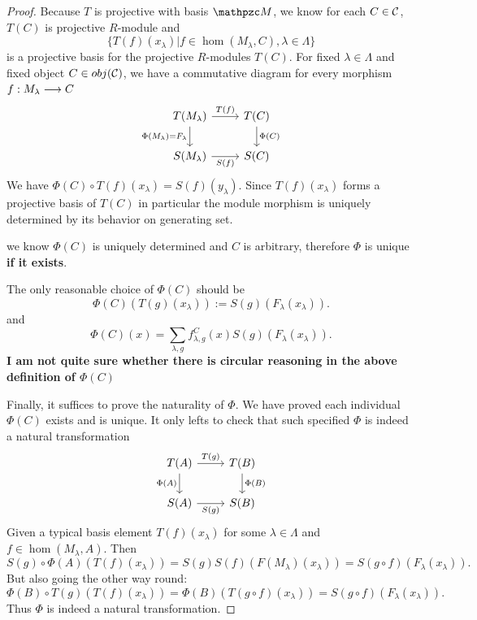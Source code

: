 \documentclass[11pt]{book} %
\begin{document}
\begin{proof}
Because $T$ is projective with basis $\pzm$, we know for each $C\in{\cal C}$, $T(C)$ is projective $R$-module and
$$
\{T(f)(x_\lambda)|f\in \hom(M_\lambda,C), \lambda\in \Lambda\}
$$
is a projective basis for the projective $R$-modules $T(C)$. For fixed $\lambda\in \Lambda$ and fixed object $C\in obj({\cal C})$, we have a commutative diagram for every morphism $f: M_\lambda\longrightarrow C$
\[
\begin{tikzcd}
T(M_\lambda) \arrow[r, "T(f)"] \arrow[d, "\Phi(M_\lambda)=F_\lambda"'] & T(C) \arrow[d, "\Phi(C)"] \\
S(M_\lambda) \arrow[r, "S(f)"'] & S(C)
\end{tikzcd}
\]
We have $\Phi(C)\circ T(f)(x_\lambda)=S(f)(y_\lambda)$. Since $T(f)(x_\lambda)$ forms a projective basis of $T(C)$ in particular the module morphism is uniquely determined by its behavior on generating set.

 we know $\Phi(C)$ is uniquely determined and $C$ is arbitrary, therefore $\Phi$ is unique \textbf{if it exists}.

The only reasonable choice of $\Phi(C)$ should be
$$
\Phi(C)(T(g)(x_\lambda)):=S(g)(F_\lambda(x_\lambda)).
$$
and
$$
\Phi(C)(x)=\sum_{\lambda,g} f_{\lambda,g}^C(x) S(g)(F_\lambda(x_\lambda)).
$$
\textbf{I am not quite sure whether there is circular reasoning in the above definition of $\Phi(C)$}

Finally, it suffices to prove the naturality of $\Phi$. We have proved each individual $\Phi(C)$ exists and is unique. It only lefts to check that such specified $\Phi$ is indeed a natural transformation
\[
\begin{tikzcd}
T(A) \arrow[r, "T(g)"] \arrow[d, "\Phi(A)"'] & T(B) \arrow[d, "\Phi(B)"] \\
S(A) \arrow[r, "S(g)"'] & S(B)
\end{tikzcd}
\]
Given a typical basis element $T(f)(x_\lambda)$ for some $\lambda\in \Lambda$ and $f\in \hom(M_\lambda,A)$. Then 
$$
S(g)\circ \Phi(A)(T(f)(x_\lambda))=S(g)S(f)(F(M_\lambda)(x_\lambda))=S(g\circ f)(F_\lambda(x_\lambda)).
$$
But also going the other way round:
$$
\Phi(B)\circ T(g) (T(f)(x_\lambda))=\Phi(B)(T(g\circ f)(x_\lambda))=S(g\circ f)(F_\lambda(x_\lambda)).
$$
Thus  $\Phi$ is indeed a natural transformation.
\end{proof}
\end{document}
